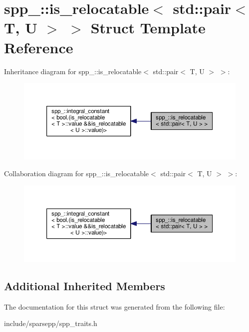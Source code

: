 \hypertarget{structspp___1_1is__relocatable_3_01std_1_1pair_3_01_t_00_01_u_01_4_01_4}{}\section{spp\+\_\+\+:\+:is\+\_\+relocatable$<$ std\+:\+:pair$<$ T, U $>$ $>$ Struct Template Reference}
\label{structspp___1_1is__relocatable_3_01std_1_1pair_3_01_t_00_01_u_01_4_01_4}


Inheritance diagram for spp\+\_\+\+:\+:is\+\_\+relocatable$<$ std\+:\+:pair$<$ T, U $>$ $>$\+:\nopagebreak
\begin{figure}[H]
\begin{center}
\leavevmode
\includegraphics[width=350pt]{structspp___1_1is__relocatable_3_01std_1_1pair_3_01_t_00_01_u_01_4_01_4__inherit__graph}
\end{center}
\end{figure}


Collaboration diagram for spp\+\_\+\+:\+:is\+\_\+relocatable$<$ std\+:\+:pair$<$ T, U $>$ $>$\+:\nopagebreak
\begin{figure}[H]
\begin{center}
\leavevmode
\includegraphics[width=350pt]{structspp___1_1is__relocatable_3_01std_1_1pair_3_01_t_00_01_u_01_4_01_4__coll__graph}
\end{center}
\end{figure}
\subsection*{Additional Inherited Members}


The documentation for this struct was generated from the following file\+:\begin{DoxyCompactItemize}
\item 
include/sparsepp/spp\+\_\+traits.\+h\end{DoxyCompactItemize}

